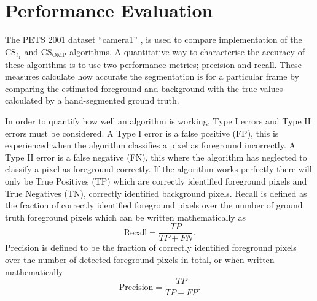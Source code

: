 




\section{Performance Evaluation}\label{sec:results}

The PETS 2001 dataset ``camera1''  \cite{pets2001},  is used to compare implementation of the CS$_{\ell_1}$ and CS$_{\text{OMP}}$ algorithms. A quantitative way to characterise the accuracy of these algorithms is to use two performance metrics; precision and recall.  These measures calculate how accurate the segmentation is for a particular frame by comparing the estimated foreground and background with the true values calculated by a hand-segmented ground truth.

In order to quantify how well an algorithm is working, Type I errors and Type II errors must be considered. A Type I error is a false positive (FP), this is experienced when the algorithm classifies a pixel as foreground incorrectly. A Type II error is a false negative (FN), this where the algorithm has neglected to classify a pixel as foreground correctly. If the algorithm works perfectly there will only be True Positives (TP) which are correctly identified foreground pixels and True Negatives (TN), correctly identified background pixels.
Recall is defined as the fraction of correctly identified foreground pixels over the number of ground truth foreground pixels which can be written mathematically as
\begin{equation}
  \label{eq:1}
\text{Recall} = \frac{TP}{TP + FN}. 
\end{equation}
Precision is defined to be the fraction of correctly identified foreground pixels over the number of detected foreground pixels in total, or when written mathematically
\begin{equation}
  \label{eq:2}
\text{Precision} = \frac{TP}{TP + FP}.
\end{equation} 


